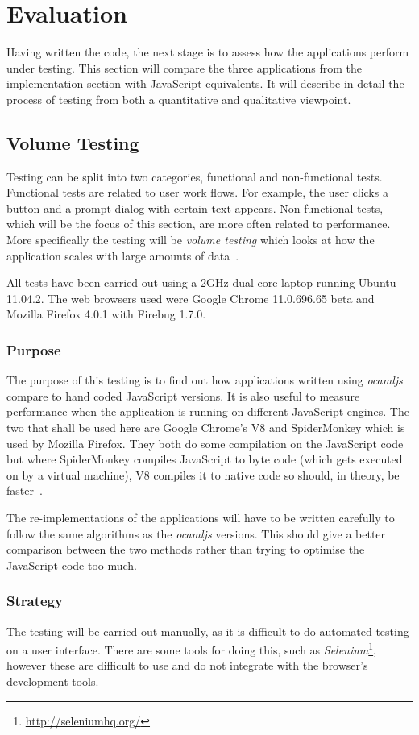 \chapter{Evaluation}
Having written the code, the next stage is to assess how the applications perform under testing. This section will compare the three applications from the implementation section with JavaScript equivalents. It will describe in detail the process of testing from both a quantitative and qualitative viewpoint.

\section{Volume Testing}
Testing can be split into two categories, functional and non-functional tests. Functional tests are related to user work flows. For example, the user clicks a button and a prompt dialog with certain text appears. Non-functional tests, which will be the focus of this section, are more often related to performance. More specifically the testing will be \emph{volume testing} which looks at how the application scales with large amounts of data~\cite{bib:art-of-testing}.

All tests have been carried out using a 2GHz dual core laptop running Ubuntu 11.04.2. The web browsers used were Google Chrome 11.0.696.65 beta and Mozilla Firefox 4.0.1 with Firebug 1.7.0.

\subsection{Purpose}
The purpose of this testing is to find out how applications written using \emph{ocamljs} compare to hand coded JavaScript versions. It is also useful to measure performance when the application is running on different JavaScript engines. The two that shall be used here are Google Chrome's V8 and SpiderMonkey which is used by Mozilla Firefox. They both do some compilation on the JavaScript code but where SpiderMonkey compiles JavaScript to byte code (which gets executed on by a virtual machine), V8 compiles it to native code so should, in theory, be faster~\cite{bib:v8-proj,bib:spidermonkey}.

The re-implementations of the applications will have to be written carefully to follow the same algorithms as the \emph{ocamljs} versions. This should give a better comparison between the two methods rather than trying to optimise the JavaScript code too much.

\subsection{Strategy}
The testing will be carried out manually, as it is difficult to do automated testing on a user interface. There are some tools for doing this, such as \emph{Selenium}\footnote{\url{http://seleniumhq.org/}}, however these are difficult to use and do not integrate with the browser's development tools.

